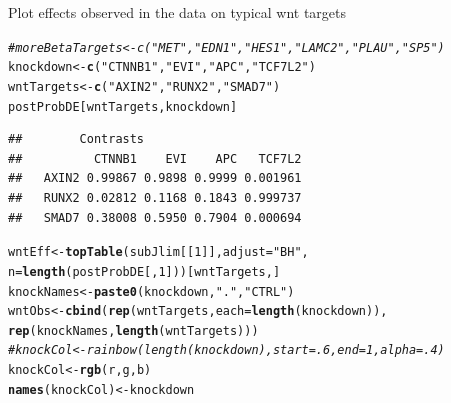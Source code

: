 \documentclass[a4paper]{article}
\makeatletter
\newcommand{\hlnum}[1]{\textcolor[rgb]{0.686,0.059,0.569}{#1}}%
\newcommand{\hlstr}[1]{\textcolor[rgb]{0.192,0.494,0.8}{#1}}%
\newcommand{\hlcom}[1]{\textcolor[rgb]{0.678,0.584,0.686}{\textit{#1}}}%
\newcommand{\hlstd}[1]{\textcolor[rgb]{0.345,0.345,0.345}{#1}}%
\newcommand{\hlkwb}[1]{\textcolor[rgb]{0.69,0.353,0.396}{#1}}%
\newcommand{\hlkwc}[1]{\textcolor[rgb]{0.333,0.667,0.333}{#1}}%
\newcommand{\hlkwd}[1]{\textcolor[rgb]{0.737,0.353,0.396}{\textbf{#1}}}%
\newenvironment{kframe}{%
 \def\at@end@of@kframe{}%
 \ifinner\ifhmode%
  \def\at@end@of@kframe{\end{minipage}}%
  \begin{minipage}{\columnwidth}%
 \fi\fi%
 \def\FrameCommand##1{\hskip\@totalleftmargin \hskip-\fboxsep
 \colorbox{shadecolor}{##1}\hskip-\fboxsep
     \hskip-\linewidth \hskip-\@totalleftmargin \hskip\columnwidth}%
 \MakeFramed {\advance\hsize-\width
   \@totalleftmargin\z@ \linewidth\hsize
   \@setminipage}}%
 {\par\unskip\endMakeFramed%
 \at@end@of@kframe}
\newenvironment{knitrout}{}{} %
\makeatother
\begin{document}
Plot effects observed in the data on typical wnt targets
\begin{knitrout}
\color{fgcolor}\begin{kframe}
\begin{alltt}
\hlcom{# moreBetaTargets <- c("MET", "EDN1", "HES1", "LAMC2", "PLAU", "SP5")}
\hlstd{knockdown} \hlkwb{<-} \hlkwd{c}\hlstd{(}\hlstr{"CTNNB1"}\hlstd{,} \hlstr{"EVI"}\hlstd{,} \hlstr{"APC"}\hlstd{,} \hlstr{"TCF7L2"}\hlstd{)}
\hlstd{wntTargets} \hlkwb{<-} \hlkwd{c}\hlstd{(}\hlstr{"AXIN2"}\hlstd{,} \hlstr{"RUNX2"}\hlstd{,} \hlstr{"SMAD7"}\hlstd{)}
\hlstd{postProbDE[wntTargets, knockdown]}
\end{alltt}
\begin{verbatim}
##        Contrasts
##          CTNNB1    EVI    APC   TCF7L2
##   AXIN2 0.99867 0.9898 0.9999 0.001961
##   RUNX2 0.02812 0.1168 0.1843 0.999737
##   SMAD7 0.38008 0.5950 0.7904 0.000694
\end{verbatim}
\begin{alltt}
\hlstd{wntEff} \hlkwb{<-} \hlkwd{topTable}\hlstd{(subJlim[[}\hlnum{1}\hlstd{]],} \hlkwc{adjust}\hlstd{=}\hlstr{"BH"}\hlstd{,}
                     \hlkwc{n}\hlstd{=}\hlkwd{length}\hlstd{(postProbDE[,}\hlnum{1}\hlstd{]))[wntTargets,]}
\hlstd{knockNames} \hlkwb{<-} \hlkwd{paste0}\hlstd{(knockdown,}\hlstr{"."}\hlstd{,}\hlstr{"CTRL"}\hlstd{)}
\hlstd{wntObs} \hlkwb{<-} \hlkwd{cbind}\hlstd{(}\hlkwd{rep}\hlstd{(wntTargets,} \hlkwc{each}\hlstd{=}\hlkwd{length}\hlstd{(knockdown)),}
                \hlkwd{rep}\hlstd{(knockNames,} \hlkwd{length}\hlstd{(wntTargets)) )}
\hlcom{# knockCol <- rainbow(length(knockdown), start=.6, end=1, alpha = .4)}
\hlstd{knockCol} \hlkwb{<-} \hlkwd{rgb}\hlstd{(r,g,b)}
\hlkwd{names}\hlstd{(knockCol)} \hlkwb{<-} \hlstd{knockdown}
\end{alltt}
\end{kframe}
\end{knitrout}
\end{document}
